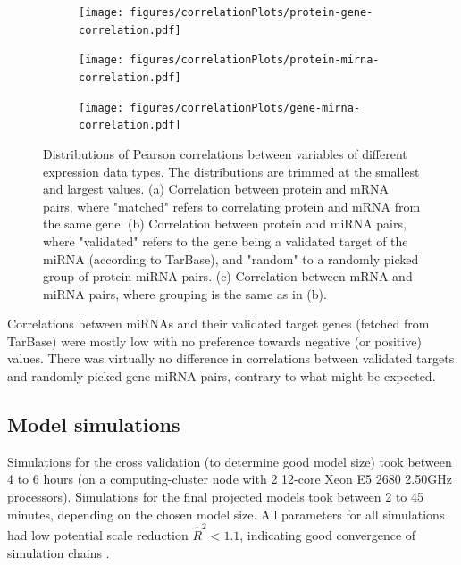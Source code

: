 \begin{figure}[!h]
  \centering
  \begin{subfigure}{.45\textwidth}
    \subcaption{ \label{fig:protein-gene-cor}}
    \centering
    \texttt{[image: figures/correlationPlots/protein-gene-correlation.pdf]}
  \end{subfigure}
  \begin{subfigure}{.45\textwidth}
    \subcaption{ \label{fig:protein-mirna-cor}}
    \centering
    \texttt{[image: figures/correlationPlots/protein-mirna-correlation.pdf]}
  \end{subfigure}
  \begin{subfigure}{.45\textwidth}
    \subcaption{ \label{fig:gene-mirna-cor}}
    \texttt{[image: figures/correlationPlots/gene-mirna-correlation.pdf]}
  \end{subfigure}

  \caption{Distributions of Pearson correlations between variables of different expression data types.
  The distributions are trimmed at the smallest and largest values.
  (a) Correlation between protein and mRNA pairs, where "matched" refers to correlating
  protein and mRNA from the same gene.
  (b) Correlation between protein and miRNA pairs, where "validated" refers to the gene
  being a validated target of the miRNA (according to TarBase),
  and "random" to a randomly picked group of protein-miRNA pairs.
  (c) Correlation between mRNA and miRNA pairs,
  where grouping is the same as in (b).}
  \label{fig:correlations}
\end{figure}

Correlations between miRNAs and their validated target genes (fetched from
TarBase) were mostly low with no preference towards negative (or positive)
values. There was virtually no difference in correlations between validated
targets and randomly picked gene-miRNA pairs, contrary to what might be
expected.




\subsection*{Model simulations}

Simulations for the cross validation (to determine good model size) took
between 4 to 6 hours (on a computing-cluster node with 2 12-core Xeon E5 2680
2.50GHz processors). Simulations for the final projected models took between 2
to 45 minutes, depending on the chosen model size. All parameters for all
simulations had low potential scale reduction $\hat{R}^2 < 1.1$, indicating
good convergence of simulation chains \citep{Gelman2013}.

